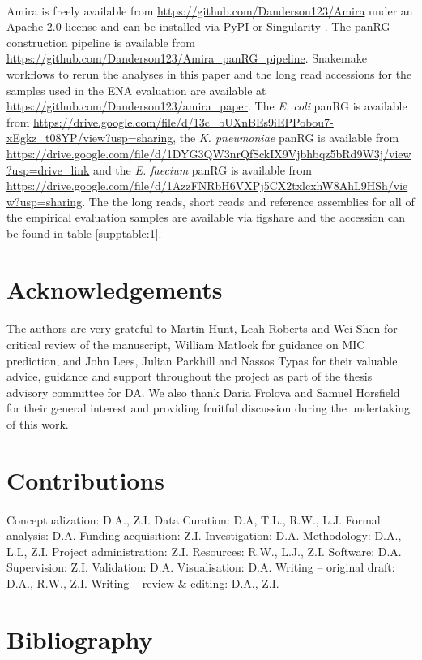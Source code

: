 \paragraph{}
Amira is freely available from \url{https://github.com/Danderson123/Amira} under an Apache-2.0 license and can be installed via PyPI or Singularity \cite{10.1371/journal.pone.0177459}. The panRG construction pipeline is available from \url{https://github.com/Danderson123/Amira_panRG_pipeline}. Snakemake workflows to rerun the analyses in this paper and the long read accessions for the samples used in the ENA evaluation are available at \url{https://github.com/Danderson123/amira_paper}. The \textit{E. coli} panRG is available from \url{https://drive.google.com/file/d/13c_bUXnBEs9iEPPobou7-xEgkz_t08YP/view?usp=sharing}, the \textit{K. pneumoniae} panRG is available from \url{https://drive.google.com/file/d/1DYG3QW3nrQfSckIX9Vjbhbqz5bRd9W3j/view?usp=drive_link} and the \textit{E. faecium} panRG is available from \url{https://drive.google.com/file/d/1AzzFNRbH6VXPj5CX2txlcxhW8AhL9HSh/view?usp=sharing}. The the long reads, short reads and reference assemblies for all of the empirical evaluation samples are available via figshare and the accession can be found in table \ref{supptable:1}.

\section*{Acknowledgements}
\paragraph{}
The authors are very grateful to Martin Hunt, Leah Roberts and Wei Shen for critical review of the manuscript, William Matlock for guidance on MIC prediction, and John Lees, Julian Parkhill and Nassos Typas for their valuable advice, guidance and support throughout the project as part of the thesis advisory committee for DA. We also thank Daria Frolova and Samuel Horsfield for their general interest and providing fruitful discussion during the undertaking of this work.

\section*{Contributions}
\paragraph{}
Conceptualization: D.A., Z.I. Data Curation: D.A, T.L., R.W., L.J. Formal analysis: D.A. Funding acquisition: Z.I. Investigation: D.A. Methodology: D.A., L.L, Z.I. Project administration: Z.I. Resources: R.W., L.J., Z.I. Software: D.A. Supervision: Z.I. Validation: D.A. Visualisation: D.A. Writing – original draft: D.A., R.W., Z.I. Writing – review \& editing: D.A., Z.I.

\section*{Bibliography}

